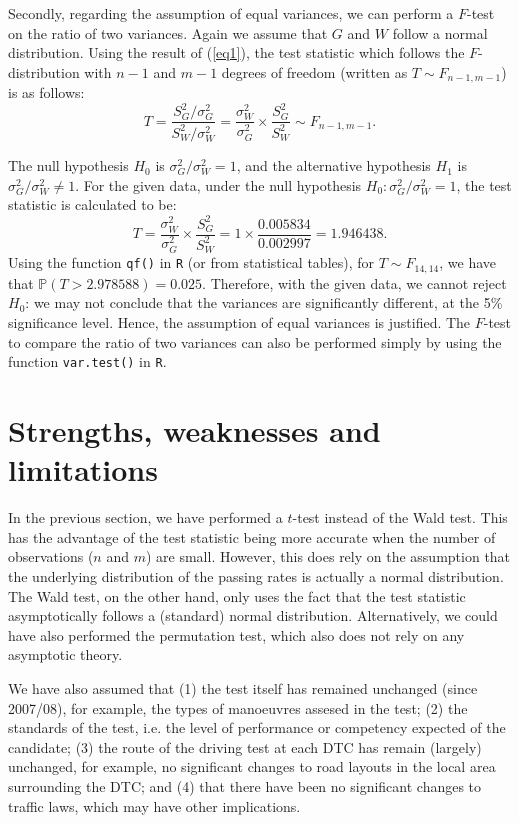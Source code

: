 \documentclass{article}
\begin{document}
Secondly, regarding the assumption of equal variances, we can perform a $F$-test on the ratio of two variances. Again we assume that $G$ and $W$ follow a normal distribution. Using the result of (\ref{eq1}), the test statistic which follows the $F$-distribution with $n-1$ and $m-1$ degrees of freedom (written as $T \sim F_{n-1,m-1}$) is as follows:
$$
T = \frac{S_G^2/\sigma_G^2}{S_W^2/\sigma_W^2} = \frac{\sigma_W^2}{\sigma_G^2}\times\frac{S_G^2}{S_W^2} \sim F_{n-1, m-1}.
$$

The null hypothesis $H_0$ is $\sigma_G^2 / \sigma_W^2 = 1$, and the alternative hypothesis $H_1$ is $\sigma_G^2/\sigma_W^2 \neq 1$. For the given data, under the null hypothesis $H_0: \sigma_G^2/\sigma_W^2=1$, the test statistic is calculated to be:
$$
T = \frac{\sigma_W^2}{\sigma_G^2}\times\frac{S_G^2}{S_W^2} = 1 \times \frac{0.005834}{0.002997} = 1.946438.
$$
Using the function \texttt{qf()} in \texttt{R} (or from statistical tables), for $T \sim F_{14,14}$, we have that $\mathbb{P}(T > 2.978588)=0.025$. Therefore, with the given data, we cannot reject $H_0$: we may not conclude that the variances are significantly different, at the 5\% significance level. Hence, the assumption of equal variances is justified. The $F$-test to compare the ratio of two variances can also be performed simply by using the function \texttt{var.test()} in \texttt{R}.

\section*{Strengths, weaknesses and limitations}
In the previous section, we have performed a $t$-test instead of the Wald test. This has the advantage of the test statistic being more accurate when the number of observations ($n$ and $m$) are small. However, this does rely on the assumption that the underlying distribution of the passing rates is actually a normal distribution. The Wald test, on the other hand, only uses the fact that the test statistic asymptotically follows a (standard) normal distribution. Alternatively, we could have also performed the permutation test, which also does not rely on any asymptotic theory. 

We have also assumed that (1) the test itself has remained unchanged (since 2007/08), for example, the types of manoeuvres assesed in the test; (2) the standards of the test, i.e. the level of performance or competency expected of the candidate; (3) the route of the driving test at each DTC has remain (largely) unchanged, for example, no significant changes to road layouts in the local area surrounding the DTC; and (4) that there have been no significant changes to traffic laws, which may have other implications. 
\end{document}
